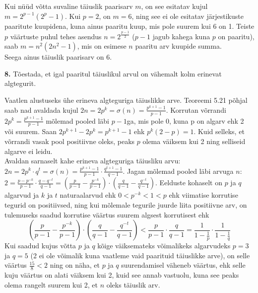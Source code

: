 \documentclass[a4paper, 10pt]{article}
\begin{document}
\indent Kui nüüd võtta suvaline täiuslik paarisarv $m$, on see esitatav kujul $m=2^{p-1}(2^p-1)$. Kui $p=2$, on $m=6$, ning see ei ole esitatav järjestikuste paaritute kuupidena, kuna ainus paaritu kuup, mis pole suurem kui 6 on 1. Teiste $p$ väärtuste puhul tehes asendus $n=2^{\frac{p-1}2}$ ($p-1$ jagub kahega kuna $p$ on paaritu), saab $m=n^2(2n^2-1)$, mis on esimese $n$ paaritu arv kuupide summa.\\
Seega ainus täiuslik paarisarv on 6.
\bigskip

\pagebreak

\noindent \textbf{8.} Tõestada, et igal paaritul täiuslikul arvul on vähemalt kolm erinevat algtegurit. 

\bigskip
Vaatlen alustuseks ühe erineva algteguriga täiuslikke arve. Teoreemi 5.21 põhjal saab nad avaldada kujul $2n=2p^k=\sigma(n)=\frac{p^{k+1}-1}{p-1}$. Korrutan võrrandi $2p^k=\frac{p^{k+1}-1}{p-1}$ mõlemad pooled läbi $p-1$ga, mis pole 0, kuna p on algarv ehk 2 või suurem. Saan $2p^{k+1}-2p^k=p^{k+1}-1$ ehk $p^k(2-p)=1$. Kuid selleks, et võrrandi vasak pool positiivne oleks, peaks $p$ olema väiksem kui 2 ning selliseid algarve ei leidu.\\
Avaldan sarnaselt kahe erineva algteguriga täiusliku arvu: $2n=2p^k\cdot q^t=\sigma(n)=\frac{p^{k+1}-1}{p-1}\cdot\frac{q^{t+1}-1}{q-1}$. Jagan mõlemad pooled läbi arvuga $n$: $2=\frac{p-p^{-k}}{p-1}\cdot\frac{q-q^{-t}}{q-1}=\left(\frac{p}{p-1}-\frac{p^{-k}}{p-1}\right)\cdot\left(\frac{q}{q-1}-\frac{q^{-t}}{q-1}\right)$. Eelduste kohaselt on $p$ ja $q$ algarvud ja $k$ ja $t$ naturaalarvud ehk $0<p^{-k}<1<p$ ehk viimatise korrutise tegurid on positiivsed, ning kui mõlemale tegurile juurde liita positiivne arv, on tulemuseks saadud korrutise väärtus suurem algsest korrutisest ehk $$\left(\frac{p}{p-1}-\frac{p^{-k}}{p-1}\right)\cdot\left(\frac{q}{q-1}-\frac{q^{-t}}{q-1}\right)<\frac{p}{p-1}\cdot\frac{q}{q-1}=\frac{1}{1-\frac{1}{p}}\cdot\frac{1}{1-\frac 1q}$$ Kui saadud kujus võtta $p$ ja $q$ kõige väiksemateks võimalikeks algarvudeks $p=3$ ja $q=5$ (2 ei ole võimalik kuna vaatleme vaid paarituid täiuslikke arve), on selle väärtus $\frac{15}8<2$ ning on näha, et $p$ ja $q$ suurendamisel väheneb väärtus, ehk selle kuju väärtus on alati väiksem kui 2, kuid see annab vastuolu, kuna see peaks olema rangelt suurem kui 2, et $n$ oleks täiuslik arv.
\end{document}
